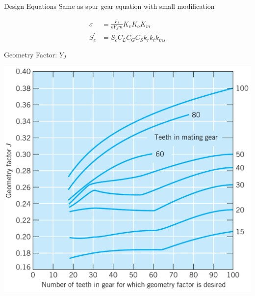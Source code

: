 \documentclass[10pt, svgnames]{beamer}
\begin{document}
\begin{frame}[label={sec:org762cada}]{Design Equations}
Same as spur gear equation with small modification

\begin{align*}
    \sigma &= \frac{F_{t}}{bY_{J}m} K_{v} K_{o} K_{m} \\
    S_{e}^{\prime} &= S_{e}C_{L}C_{G}C_{S}k_{r}k_{t}k_{ms}
\end{align*}
\end{frame}

\begin{frame}[label={sec:org678f012}]{Geometry Factor: \(Y_{J}\)}
\begin{center}
\includegraphics[width=.9\linewidth]{pictures/geometry-factor-bevel.png}
\end{center}
\end{frame}
\end{document}
